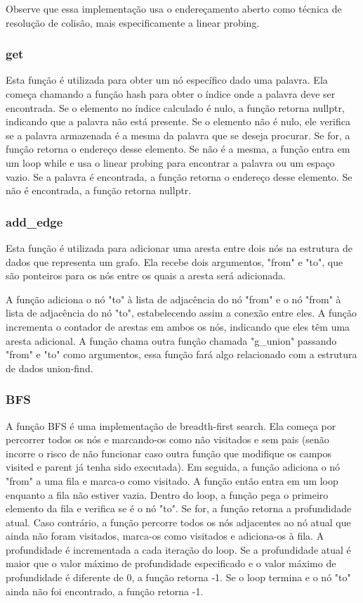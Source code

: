 \documentclass[a4paper,11pt]{article}
\begin{document}
Observe que essa implementação usa o endereçamento aberto como técnica de resolução de colisão, mais especificamente a linear probing.

    \subsubsection{get}
    Esta função é utilizada para obter um nó específico dado uma palavra. Ela começa chamando a função hash para obter o índice onde a palavra deve ser encontrada. Se o elemento no índice calculado é nulo, a função retorna nullptr, indicando que a palavra não está presente. Se o elemento não é nulo, ele verifica se a palavra armazenada é a mesma da palavra que se deseja procurar. Se for, a função retorna o endereço desse elemento. Se não é a mesma, a função entra em um loop while e usa o linear probing para encontrar a palavra ou um espaço vazio. Se a palavra é encontrada, a função retorna o endereço desse elemento. Se não é encontrada, a função retorna nullptr.

    \subsubsection{add\_edge}
    Esta função é utilizada para adicionar uma aresta entre dois nós na estrutura de dados que representa um grafo. Ela recebe dois argumentos, "from" e "to", que são ponteiros para os nós entre os quais a aresta será adicionada.

    A função adiciona o nó "to" à lista de adjacência do nó "from" e o nó "from" à lista de adjacência do nó "to", estabelecendo assim a conexão entre eles.
    A função incrementa o contador de arestas em ambos os nós, indicando que eles têm uma aresta adicional.
    A função chama outra função chamada "g\_union" passando "from" e "to" como argumentos, essa função fará algo relacionado com a estrutura de dados union-find.

    \subsubsection{BFS}
    A função BFS é uma implementação de breadth-first search. Ela começa por percorrer todos os nós e marcando-os como não visitados e sem pais (senão incorre o risco de não funcionar caso outra função que modifique os campos visited e parent já tenha sido executada). Em seguida, a função adiciona o nó "from" a uma fila e marca-o como visitado. A função então entra em um loop enquanto a fila não estiver vazia. Dentro do loop, a função pega o primeiro elemento da fila e verifica se é o nó "to". Se for, a função retorna a profundidade atual. Caso contrário, a função percorre todos os nós adjacentes ao nó atual que ainda não foram visitados, marca-os como visitados e adiciona-os à fila. A profundidade é incrementada a cada iteração do loop. Se a profundidade atual é maior que o valor máximo de profundidade especificado e o valor máximo de profundidade é diferente de 0, a função retorna -1. Se o loop termina e o nó "to" ainda não foi encontrado, a função retorna -1.
\end{document}
